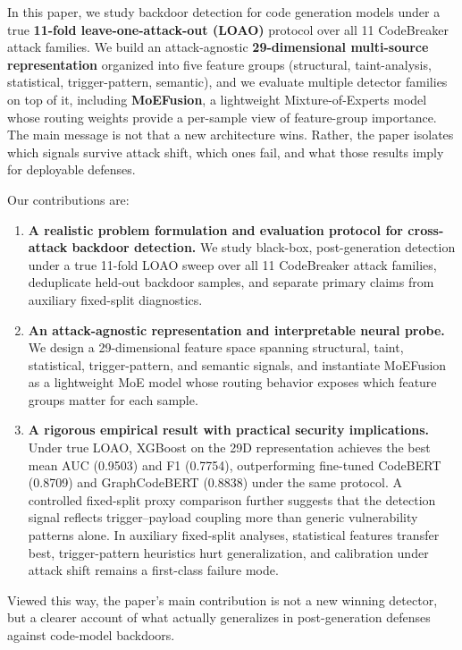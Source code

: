 ﻿\documentclass[sigconf,review,anonymous]{acmart}
\newcommand{\sys}{MoEFusion}
\begin{document}
In this paper, we study backdoor detection for code generation models under a
true \textbf{11-fold leave-one-attack-out (LOAO)} protocol over all 11
CodeBreaker attack families. We build an attack-agnostic
\textbf{29-dimensional multi-source representation} organized into five feature
groups (structural, taint-analysis, statistical, trigger-pattern, semantic),
and we evaluate multiple detector families on top of it, including
\textbf{\sys{}}, a lightweight Mixture-of-Experts model whose routing weights
provide a per-sample view of feature-group importance. The main message is not
that a new architecture wins. Rather, the paper isolates which signals survive
attack shift, which ones fail, and what those results imply for deployable
defenses.

Our contributions are:
\begin{enumerate}
\item \textbf{A realistic problem formulation and evaluation protocol for
  cross-attack backdoor detection.}
  We study black-box, post-generation detection under a true 11-fold LOAO sweep
  over all 11 CodeBreaker attack families, deduplicate held-out backdoor
  samples, and separate primary claims from auxiliary fixed-split diagnostics.

\item \textbf{An attack-agnostic representation and interpretable neural probe.}
  We design a 29-dimensional feature space spanning structural, taint,
  statistical, trigger-pattern, and semantic signals, and instantiate
  \sys{} as a lightweight MoE model whose routing behavior exposes which feature
  groups matter for each sample.

\item \textbf{A rigorous empirical result with practical security implications.}
  Under true LOAO, XGBoost on the 29D representation achieves the best mean AUC
  (0.9503) and F1 (0.7754), outperforming fine-tuned CodeBERT (0.8709) and
  GraphCodeBERT (0.8838) under the same protocol.
  A controlled fixed-split proxy comparison further suggests that the detection
  signal reflects trigger--payload coupling more than generic vulnerability
  patterns alone.
  In auxiliary fixed-split analyses, statistical features transfer best,
  trigger-pattern heuristics hurt generalization, and calibration under attack
  shift remains a first-class failure mode.
\end{enumerate}

Viewed this way, the paper's main contribution is not a new winning detector,
but a clearer account of what actually generalizes in post-generation defenses
against code-model backdoors.
\end{document}
